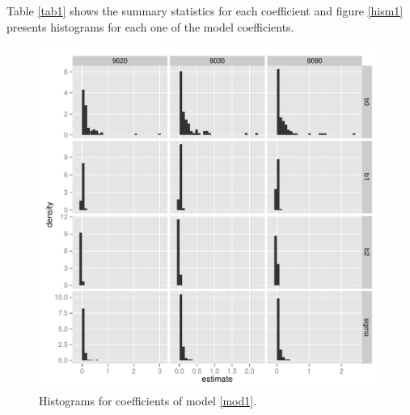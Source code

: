 \documentclass{article}\usepackage{graphicx, color}
\begin{document}
Table \ref{tab1} shows the summary statistics for each coefficient and figure \ref{hism1} presents histograms for each one of the model coefficients.

\begin{figure}[h!]
\centering
\includegraphics[scale=.6]{hist_m1.pdf}
\caption{Histograms for coefficients of model \ref{mod1}. \label{histm1}}
\end{figure}
\end{document}
